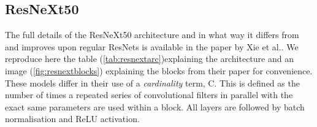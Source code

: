 \documentclass[12pt]{article}
\numberwithin{equation}{section}
\numberwithin{figure}{section}
\begin{document}
\subsection{ResNeXt50} 
\label{sub:ResNeXt50} 
The full details of the ResNeXt50 architecture and in what way it differs from and improves upon regular ResNets is available in the paper by Xie et al.\cite{Xie2016}. We reproduce here the table (\cref{tab:resnextarc})explaining the architecture and an image (\cref{fig:resnextblocks}) explaining the blocks from their paper for convenience. These models differ in their use of a \emph{cardinality} term, C. This is defined as the number of times a repeated series of convolutional filters in parallel with the exact same parameters are used within a block. All layers are followed by batch normalisation and ReLU activation.
\end{document}
